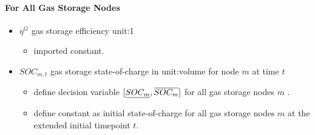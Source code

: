 \paragraph{For All Gas Storage Nodes}
\begin{itemize}

\item $\eta^G$ gas storage efficiency \gls{unit:1}
  \begin{itemize}
  \item \gls{imported} constant.
  \end{itemize}

\item $SOC_{m,t}$ gas storage state-of-charge in \gls{unit:volume}
for node $m$ at time $t$ \begin{itemize} \item \gls{define} decision variable
  $[\underline{SOC_m}, \overline{SOC_m}]$ for all gas storage nodes
  $m$ \atallt{}.  \item \gls{define} constant as initial state-of-charge for all
  gas storage nodes $m$ at the extended initial timepoint $t$.  \end{itemize}

\end{itemize}
